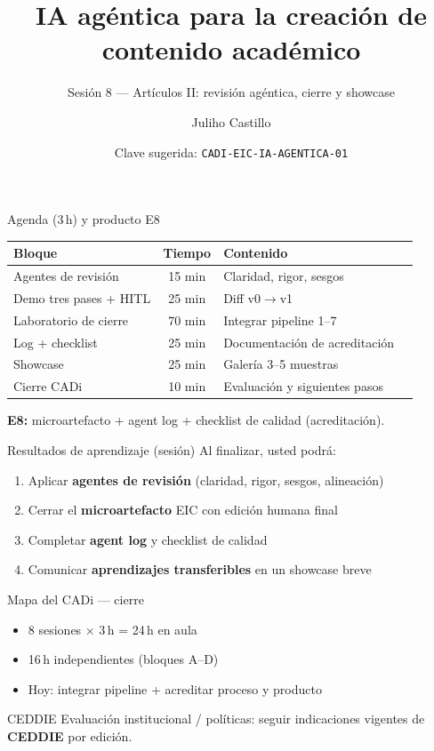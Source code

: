 \documentclass[aspectratio=169,11pt]{beamer}
\title{IA agéntica para la creación de contenido académico}
\subtitle{Sesión 8 --- Artículos II: revisión agéntica, cierre y showcase}
\author{Juliho Castillo}
\institute{CADi 40\,h · Escuela de Ingeniería y Ciencias\\
Tecnológico de Monterrey}
\date{Clave sugerida: \texttt{CADI-EIC-IA-AGENTICA-01}}
\begin{document}
\begin{frame}
\titlepage
\end{frame}

\begin{frame}{Agenda (3\,h) y producto E8}
\begin{tabularx}{\textwidth}{@{}lclX@{}}
\toprule
Bloque & Tiempo & Contenido \\
\midrule
Agentes de revisión & 15 min & Claridad, rigor, sesgos \\
Demo tres pases + HITL & 25 min & Diff v0$\rightarrow$v1 \\
Laboratorio de cierre & 70 min & Integrar pipeline 1--7 \\
Log + checklist & 25 min & Documentación de acreditación \\
Showcase & 25 min & Galería 3--5 muestras \\
Cierre CADi & 10 min & Evaluación y siguientes pasos \\
\bottomrule
\end{tabularx}
\vspace{0.5em}
\textbf{E8:} microartefacto + agent log + checklist de calidad (acreditación).
\end{frame}

\begin{frame}{Resultados de aprendizaje (sesión)}
Al finalizar, usted podrá:
\begin{enumerate}
\item Aplicar \textbf{agentes de revisión} (claridad, rigor, sesgos, alineación)
\item Cerrar el \textbf{microartefacto} EIC con edición humana final
\item Completar \textbf{agent log} y checklist de calidad
\item Comunicar \textbf{aprendizajes transferibles} en un showcase breve
\end{enumerate}
\end{frame}

\begin{frame}{Mapa del CADi --- cierre}
\begin{itemize}
\item 8 sesiones $\times$ 3\,h = 24\,h en aula
\item 16\,h independientes (bloques A--D)
\item Hoy: integrar pipeline + acreditar proceso y producto
\end{itemize}
\begin{block}{CEDDIE}
Evaluación institucional / políticas: seguir indicaciones vigentes de \textbf{CEDDIE} por edición.
\end{block}
\end{frame}
\end{document}

